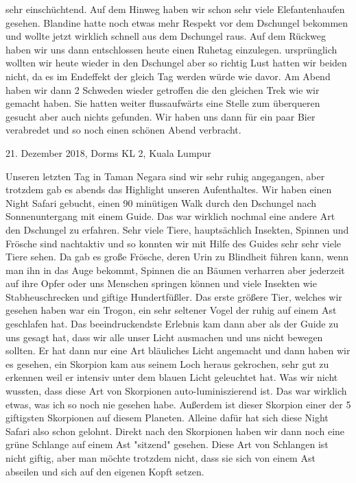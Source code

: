 \documentclass[11pt]{book}
\begin{document}
sehr einschüchtend. Auf dem Hinweg haben wir schon sehr viele Elefantenhaufen gesehen. Blandine hatte noch etwas mehr Respekt 
vor dem Dschungel bekommen und wollte jetzt wirklich schnell aus dem Dschungel raus. Auf dem Rückweg haben wir uns dann entschlossen 
heute einen Ruhetag einzulegen. ursprünglich wollten wir heute wieder in den Dschungel aber so richtig Lust hatten wir beiden nicht, 
da es im Endeffekt der gleich Tag werden würde wie davor. Am Abend haben wir dann 2 Schweden wieder getroffen die den gleichen Trek 
wie wir gemacht haben. Sie hatten weiter flussaufwärts eine Stelle zum überqueren gesucht aber auch nichts gefunden. Wir haben uns
dann für ein paar Bier verabredet und so noch einen schönen Abend verbracht. 

21. Dezember 2018, Dorms KL 2, Kuala Lumpur

Unseren letzten Tag in Taman Negara sind wir sehr ruhig angegangen, aber trotzdem gab es abends das Highlight unseren Aufenthaltes. 
Wir haben einen Night Safari gebucht, einen 90 minütigen Walk durch den Dschungel nach Sonnenuntergang mit einem Guide. Das war 
wirklich nochmal eine andere Art den Dschungel zu erfahren. Sehr viele Tiere, hauptsächlich Insekten, Spinnen und Frösche sind nachtaktiv 
und so konnten wir mit Hilfe des Guides sehr sehr viele Tiere sehen. Da gab es große Frösche, deren Urin zu Blindheit führen kann, 
wenn man ihn in das Auge bekommt, Spinnen die an Bäumen verharren aber jederzeit auf ihre Opfer oder uns Menschen springen können 
und viele Insekten wie Stabheuschrecken und giftige Hundertfüßler. Das erste größere Tier, welches wir gesehen haben war ein Trogon, ein
sehr seltener Vogel der ruhig auf einem Ast geschlafen hat. Das beeindruckendste Erlebnis kam dann aber als der Guide zu uns gesagt hat, 
dass wir alle unser Licht ausmachen und uns nicht bewegen sollten. Er hat dann nur eine Art bläuliches Licht angemacht und dann haben 
wir es gesehen, ein Skorpion kam aus seinem Loch heraus gekrochen, sehr gut zu erkennen weil er intensiv unter dem blauen Licht geleuchtet 
hat. Was wir nicht wussten, dass diese Art von Skorpionen auto-luminiszierend ist. Das war wirklich etwas, was ich so noch nie gesehen 
habe. Außerdem ist dieser Skorpion einer der 5 giftigsten Skorpionen auf diesem Planeten. Alleine dafür hat sich diese Night Safari also 
schon gelohnt. Direkt nach den Skorpionen haben wir dann noch eine grüne Schlange auf einem Ast "sitzend" gesehen. Diese Art von 
Schlangen ist nicht giftig, aber man möchte trotzdem nicht, dass sie sich von einem Ast abseilen und sich auf den eigenen Kopft setzen.
\end{document}
